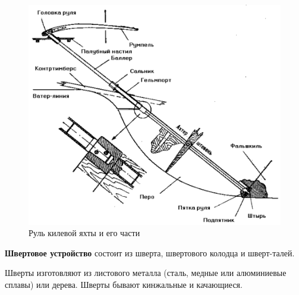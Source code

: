 \documentclass[a4paper, 12pt, twoside, final]{scrbook}
\begin{document}
\begin{figure}[htbp]
\begin{centering}
\includegraphics{pics/Rul_kilevoy_yakhty}
\par\end{centering}

\protect\caption{\label{fig:31}Руль килевой яхты и его части}


\end{figure}


\textbf{Швертовое устройство} состоит из шверта, швертового колодца
и шверт-талей.

Шверты изготовляют из листового металла (сталь, медные или алюминиевые
сплавы) или дерева. Шверты бывают кинжальные и качающиеся.
\end{document}
